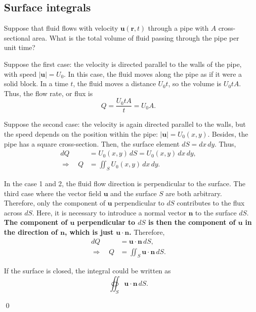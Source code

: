 \subsection{Surface integrals}
\begin{example}
    Suppose that fluid flows with velocity $\bm{u}(\bm{r},t)$ through a pipe with $A$ cross-sectional area. 
    What is the total volume of fluid passing through the pipe per unit time?
    
    Suppose the first case: the velocity is directed parallel to the walls of the pipe, with speed $|\bm{u}| = U_0$. 
    In this case, the fluid moves along the pipe as if it were a solid block. 
    In a time $t$, the fluid moves a distance $U_0 t$, so the volume is $U_0 t A$. 
    Thus, the flow rate, or flux is 
    \begin{equation}
        Q = \frac{U_0 t A}{t} = U_0 A.  
    \end{equation}

    Suppose the second case: the velocity is again directed parallel to the walls, but the speed depends on the position within the pipe: 
    $|\bm{u}| = U_0 (x,y)$.
    Besides, the pipe has a square cross-section. 
    Then, the surface element $dS = dx \, dy$. 
    Thus, 
    \begin{align}
        dQ &= U_0(x,y) \, dS = U_0(x,y) \, dx\,dy, \\
        \Longrightarrow \quad
        Q &= \iint_S U_0(x,y) \, dx\,dy. 
    \end{align}

    In the case 1 and 2, the fluid flow direction is perpendicular to the surface. 
    The third case where the vector field $\bm{u}$ and the surface $S$ are both arbitrary. 
    Therefore, only the component of $\bm{u}$ perpendicular to $dS$ contributes to the flux across $dS$.
    Here, it is necessary to introduce a normal vector $\bm{n}$ to the surface $dS$.
    \textbf{The component of $\bm{u}$ perpendicular to $dS$ is then the component of $\bm{u}$ in the direction of $\bm{n}$, which is just $\bm{u} \cdot \bm{n}$.} 
    Therefore, 
    \begin{align}
        dQ &= \bm{u} \cdot \bm{n} \, dS, \\
        \Longrightarrow \quad
        Q &= \iint_S \bm{u} \cdot \bm{n} \, dS. 
    \end{align}

    If the surface is closed, the integral could be written as 
    \begin{equation}
        \oiint_S \bm{u} \cdot \bm{n} \, dS.
    \end{equation}

    \qed 
\end{example}

